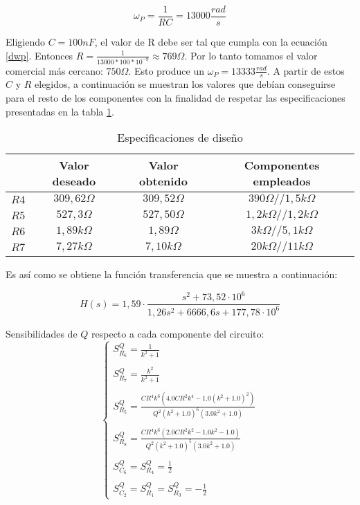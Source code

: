 \begin{equation}
	\omega_P = \frac{1}{RC} = 13000\frac{rad}{s}
	\label{dwp}
\end{equation}

Eligiendo $C = 100nF$, el valor de R debe ser tal que cumpla con la ecuaci\'on \ref{dwp}. Entonces $R = \frac{1}{13000 * 100 *10^{-9}} \approx 769\Omega.$ Por lo tanto tomamos el valor comercial m\'as cercano: $750\Omega$. Esto produce un $\omega_P = 13333 \frac{rad}{s}$. A partir de estos $C$ y $R$ elegidos, a continuaci\'on se muestran los valores que deb\'ian conseguirse para el resto de los componentes con la finalidad de respetar las especificaciones presentadas en la tabla \ref{especificaciones}.

\begin{table}[H]
	\centering
	\begin{tabular}{c c c c}%
		\bfseries  & Valor deseado & Valor obtenido& Componentes empleados \\ \hline
		$R4$ & $309,62\Omega$  & $309,52\Omega$ & $390\Omega // 1,5k\Omega$\\
			$R5$ & $527,3\Omega$  & $527,50\Omega$ & $1,2k\Omega // 1,2k\Omega$\\
				$R6$ & $1,89k\Omega$  & $1,89\Omega$ & $3k\Omega // 5,1k\Omega$\\
				$R7$ & $7,27k\Omega$  & $7,10k\Omega$ & $20k\Omega // 11k\Omega$\\
		\hline
	\end{tabular}
	\caption{Especificaciones de dise\~no}
	\label{especificaciones}
\end{table}

Es as\'i como se obtiene la funci\'on transferencia que se muestra a continuaci\'on:

\begin{equation}
H(s) = 1,59 \cdot \frac{s^2+73,52 \cdot 10^6}{1,26 s^2 + 6666,6 s + 177,78 \cdot 10^6}
\label{vovi_val}
\end{equation}

Sensibilidades de $Q$ respecto a cada componente del circuito:
\begin{equation}
\begin{cases}
S^{Q}_{R_6} = \frac{1}{k^{2} + 1}\\ \\
S^{Q}_{R_7} = \frac{k^{2}}{k^{2} + 1}\\ \\
S^{Q}_{R_5} =\frac{C R^{4} k^{6} \left(4.0 C R^{2} k^{4} - 1.0 \left(k^{2} + 1.0\right)^{2}\right)}{Q^{2} \left(k^{2} + 1.0\right)^{6} \left(3.0 k^{2} + 1.0\right)}
 \\ \\
S^{Q}_{R_8} = \frac{C R^{4} k^{6} \left(2.0 C R^{2} k^{2} - 1.0 k^{2} - 1.0\right)}{Q^{2} \left(k^{2} + 1.0\right)^{5} \left(3.0 k^{2} + 1.0\right)}
\\ \\
S^{Q}_{C_6} = S^{Q}_{R_4} =\frac{1}{2} \\ \\
S^{Q}_{C_2} = S^{Q}_{R_1} = S^{Q}_{R_3} =-\frac{1}{2}
\end{cases}
\end{equation}

